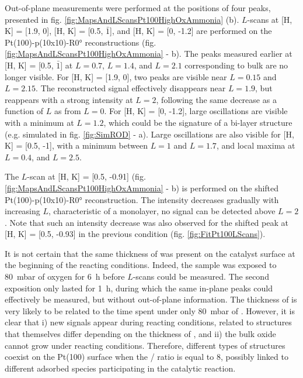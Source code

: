 Out-of-plane measurements were performed at the positions of four peaks, presented in fig. \ref{fig:MapsAndLScansPt100HighOxAmmonia} (b).
$L$-scans at [H, K] = [1.9, 0], [H, K] = [0.5,  $\bar{1}$], and [H, K] = [0, -1.2] are performed on the Pt(100)-p(10x10)-R\ang{0} reconstructions (fig. \ref{fig:MapsAndLScansPt100HighOxAmmonia} - b).
The peaks measured earlier at [H, K] = [0.5, $\bar{1}$] at $L=0.7$, $L=1.4$, and $L=2.1$ corresponding to bulk  are no longer visible.
For [H, K] = [1.9, 0], two peaks are visible near $L=0.15$ and $L=2.15$.
The reconstructed signal effectively disappears near $L=1.9$, but reappears with a strong intensity at $L=2$, following the same decrease as a function of $L$ as from $L=0$.
For [H, K] = [0, -1.2], large oscillations are visible with a minimum at $L=1.2$, which could be the signature of a bi-layer structure (e.g. simulated  in fig. \ref{fig:SimROD} - a).
Large oscillations are also visible for [H, K] = [0.5, -1], with a minimum between $L=1$ and $L=1.7$, and local maxima at $L=0.4$, and $L=2.5$.

The $L$-scan at [H, K] = [0.5, -0.91] (fig. \ref{fig:MapsAndLScansPt100HighOxAmmonia} - b) is performed on the shifted Pt(100)-p(10x10)-R\ang{0} reconstruction.
The intensity decreases gradually with increasing $L$, characteristic of a monolayer, no signal can be detected above $L=2$.
Note that such an intensity decrease was also observed for the shifted peak at [H, K] = [0.5, -0.93] in the previous condition (fig. \ref{fig:FitPt100LScans}).

It is not certain that the same thickness of  was present on the catalyst surface at the beginning of the reacting conditions.
Indeed, the sample was exposed to \qty{80}{\milli\bar} of oxygen for \qty{6}{\hour} before $L$-scans could be measured.
The second exposition only lasted for \qty{1}{\hour}, during which the same in-plane peaks could effectively be measured, but without out-of-plane information.
The thickness of  is very likely to be related to the time spent under only \qty{80}{\milli\bar} of .
However, it is clear that i) new signals appear during reacting conditions, related to structures that themselves differ depending on the thickness of , and ii) the bulk oxide cannot grow under reacting conditions.
Therefore, different types of structures coexist on the Pt(100) surface when the / ratio is equal to \num{8}, possibly linked to different adsorbed species participating in the catalytic reaction.

